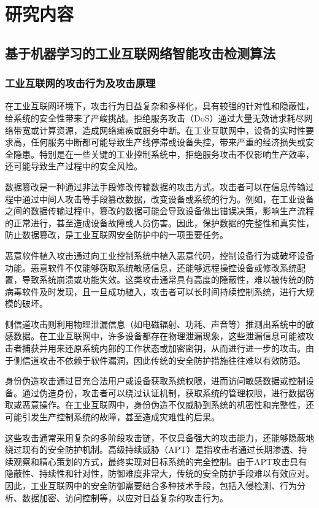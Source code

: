 \section{研究内容}

\subsection{基于机器学习的工业互联网络智能攻击检测算法}

\subsubsection{工业互联网的攻击行为及攻击原理}

在工业互联网环境下，攻击行为日益复杂和多样化，具有较强的针对性和隐蔽性，给系统的安全性带来了严峻挑战。拒绝服务攻击（DoS）通过大量无效请求耗尽网络带宽或计算资源，造成网络瘫痪或服务中断。在工业互联网中，设备的实时性要求高，任何服务中断都可能导致生产线停滞或设备失控，带来严重的经济损失或安全隐患。特别是在一些关键的工业控制系统中，拒绝服务攻击不仅影响生产效率，还可能导致生产过程中的安全风险。

数据篡改是一种通过非法手段修改传输数据的攻击方式。攻击者可以在信息传输过程中通过中间人攻击等手段篡改数据，改变设备或系统的行为。例如，在工业设备之间的数据传输过程中，篡改的数据可能会导致设备做出错误决策，影响生产流程的正常进行，甚至造成设备故障或人员伤害。因此，保护数据的完整性和真实性，防止数据篡改，是工业互联网安全防护中的一项重要任务。

恶意软件植入攻击通过向工业控制系统中植入恶意代码，控制设备行为或破坏设备功能。恶意软件不仅能够窃取系统敏感信息，还能够远程操控设备或修改系统配置，导致系统崩溃或功能失效。这类攻击通常具有高度的隐蔽性，难以被传统的防病毒软件及时发现，且一旦成功植入，攻击者可以长时间持续控制系统，进行大规模的破坏。

侧信道攻击则利用物理泄漏信息（如电磁辐射、功耗、声音等）推测出系统中的敏感数据。在工业互联网中，许多设备都存在物理泄漏现象，这些泄漏信息可能被攻击者捕获并用来还原系统内部的工作状态或加密密钥，从而进行进一步的攻击。由于侧信道攻击不依赖于软件漏洞，因此传统的安全防护措施往往难以有效防范。

身份伪造攻击通过冒充合法用户或设备获取系统权限，进而访问敏感数据或控制设备。通过伪造身份，攻击者可以绕过认证机制，获取系统的管理权限，进行数据窃取或恶意操作。在工业互联网中，身份伪造不仅威胁到系统的机密性和完整性，还可能引发生产控制系统的故障，甚至造成灾难性的后果。

这些攻击通常采用复杂的多阶段攻击链，不仅具备强大的攻击能力，还能够隐蔽地绕过现有的安全防护机制。高级持续威胁（APT）是指攻击者通过长期渗透、持续观察和精心策划的方式，最终实现对目标系统的完全控制。由于APT攻击具有隐蔽性、持续性和针对性，防御难度非常大，传统的安全防护手段难以有效应对。因此，工业互联网中的安全防御需要结合多种技术手段，包括入侵检测、行为分析、数据加密、访问控制等，以应对日益复杂的攻击行为。

